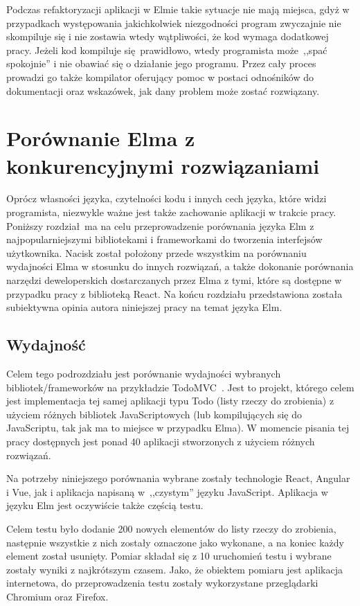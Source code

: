 \documentclass[twoside,a4paper]{report}
\begin{document}
Podczas refaktoryzacji aplikacji w Elmie takie sytuacje nie mają miejsca, gdyż w przypadkach występowania jakichkolwiek niezgodności program zwyczajnie nie skompiluje się i nie zostawia wtedy wątpliwości, że kod wymaga dodatkowej pracy.
Jeżeli kod kompiluje się prawidłowo, wtedy programista może~,,spać spokojnie'' i nie obawiać się o działanie jego programu.
Przez cały proces prowadzi go także kompilator oferujący pomoc w postaci odnośników do dokumentacji oraz wskazówek, jak dany problem może zostać rozwiązany.


\chapter{Porównanie Elma z konkurencyjnymi rozwiązaniami}
Oprócz własności języka, czytelności kodu i innych cech języka, które widzi programista, niezwykle ważne jest także zachowanie aplikacji w trakcie pracy.
Poniższy rozdział ma na celu przeprowadzenie porównania języka Elm z najpopularniejszymi bibliotekami i frameworkami do tworzenia interfejsów użytkownika.
Nacisk został położony przede wszystkim na porównaniu wydajności Elma w stosunku do innych rozwiązań, a także dokonanie porównania narzędzi deweloperskich dostarczanych przez Elma z tymi, które są dostępne w przypadku pracy z biblioteką React.
Na końcu rozdziału przedstawiona została subiektywna opinia autora niniejszej pracy na temat języka Elm.

\section{Wydajność}
Celem tego podrozdziału jest porównanie wydajności wybranych bibliotek/frameworków na przykładzie TodoMVC~\cite{todomvc}.
Jest to projekt, którego celem jest implementacja tej samej aplikacji typu Todo (listy rzeczy do zrobienia) z użyciem różnych bibliotek JavaScriptowych (lub kompilujących się do JavaScriptu, tak jak ma to miejsce w przypadku Elma).
W momencie pisania tej pracy dostępnych jest ponad 40 aplikacji stworzonych z użyciem różnych rozwiązań.

Na potrzeby niniejszego porównania wybrane zostały technologie React, Angular i Vue, jak i aplikacja napisaną w~,,czystym'' języku JavaScript.
Aplikacja w języku Elm jest oczywiście także częścią testu.

Celem testu było dodanie 200 nowych elementów do listy rzeczy do zrobienia, następnie wszystkie z nich zostały oznaczone jako wykonane, a na koniec każdy element został usunięty.
Pomiar składał się z 10 uruchomień testu i wybrane zostały wyniki z najkrótszym czasem.
Jako, że obiektem pomiaru jest aplikacja internetowa, do przeprowadzenia testu zostały wykorzystane przeglądarki Chromium oraz Firefox.
\end{document}
